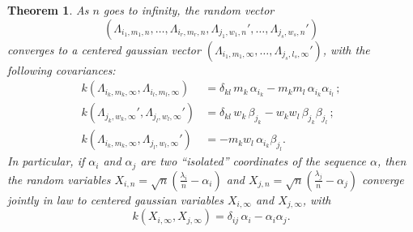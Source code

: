 \documentclass[smallextended,nospthms]{svjour3}
\newtheorem{theorem}{Theorem}
\theoremstyle{remark}
\begin{document}
\begin{theorem}\label{almostgeom}
As $n$ goes to infinity, the random vector $$(\Lambda_{i_{1},m_{1},n},\ldots,\Lambda_{i_{r},m_{r},n},\Lambda_{j_{1},w_{1},n}',\ldots,\Lambda_{j_{s},w_{s},n}')$$
 converges to a centered gaussian vector $(\Lambda_{i_{1},m_{1},\infty},\ldots,\Lambda_{j_{s},l_{s},\infty}')$, with the following covariances:
\begin{align*}
k(\Lambda_{i_{k},m_{k},\infty},\Lambda_{i_{l},m_{l},\infty})&=\delta_{kl}\,m_{k}\,\alpha_{i_{k}}-m_{k}m_{l}\,\alpha_{i_{k}}\alpha_{i_{l}}\,;\\
k(\Lambda_{j_{k},w_{k},\infty}',\Lambda_{j_{l},w_{l},\infty}')&=\delta_{kl}\,w_{k}\,\beta_{j_{k}}-w_{k}w_{l}\,\beta_{j_{k}}\beta_{j_{l}}\,;\\
k(\Lambda_{i_{k},m_{k},\infty},\Lambda_{j_{l},w_{l},\infty}')&=-m_{k}w_{l}\,\alpha_{i_{k}}\beta_{j_{l}}.
\end{align*}
In particular, if $\alpha_{i}$ and $\alpha_{j}$ are two ``isolated'' coordinates of the sequence $\alpha$, then the random variables $X_{i,n}=\sqrt{n}\left(\frac{\lambda_{i}}{n}-\alpha_{i}\right)$ and $X_{j,n}=\sqrt{n}\left(\frac{\lambda_{j}}{n}-\alpha_{j}\right)$ converge jointly in law to centered gaussian variables $X_{i,\infty}$ and $X_{j,\infty}$, with
$$k(X_{i,\infty},X_{j,\infty})=\delta_{ij}\,\alpha_{i}-\alpha_{i}\alpha_{j}.$$
\end{theorem}
\end{document}
